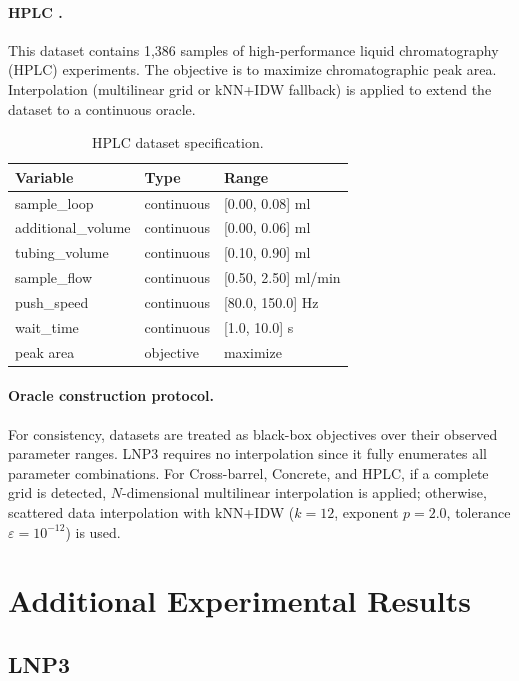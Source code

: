 \documentclass{article} %
\begin{document}
\paragraph{HPLC \citep{hase2021olympushplc}.}
This dataset contains 1,386 samples of high-performance liquid chromatography (HPLC) experiments.  
The objective is to maximize chromatographic peak area.  
Interpolation (multilinear grid or kNN+IDW fallback) is applied to extend the dataset to a continuous oracle.

\begin{table}[h]
\centering
\caption{HPLC dataset specification.}
\label{tab:hplc}
\begin{tabular}{lll}
\toprule
Variable & Type & Range \\
\midrule
sample\_loop & continuous & [0.00, 0.08] ml \\
additional\_volume & continuous & [0.00, 0.06] ml \\
tubing\_volume & continuous & [0.10, 0.90] ml \\
sample\_flow & continuous & [0.50, 2.50] ml/min \\
push\_speed & continuous & [80.0, 150.0] Hz \\
wait\_time & continuous & [1.0, 10.0] s \\
\midrule
peak area & objective & maximize \\
\bottomrule
\end{tabular}
\end{table}

\paragraph{Oracle construction protocol.}
For consistency, datasets are treated as black-box objectives over their observed parameter ranges.  
LNP3 requires no interpolation since it fully enumerates all parameter combinations.  
For Cross-barrel, Concrete, and HPLC, if a complete grid is detected, $N$-dimensional multilinear interpolation is applied; 
otherwise, scattered data interpolation with kNN+IDW ($k=12$, exponent $p=2.0$, tolerance $\varepsilon=10^{-12}$) is used.  
\section{Additional Experimental Results}
\label{app:exp}


\subsection{LNP3}
\label{app:lnp}
\end{document}
